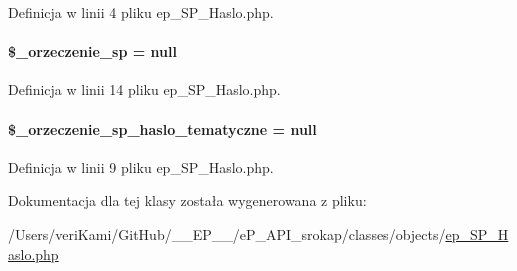 Definicja w linii 4 pliku ep\-\_\-\-S\-P\-\_\-\-Haslo.\-php.

\hypertarget{classep___s_p___haslo_aa2e1ecb50e6fae26a854ac995f7226b8}{
\paragraph[{\$\-\_\-orzeczenie\-\_\-sp}]{\setlength{\rightskip}{0pt plus 5cm}\$\-\_\-orzeczenie\-\_\-sp = null\hspace{0.3cm}{\ttfamily [protected]}}}\label{classep___s_p___haslo_aa2e1ecb50e6fae26a854ac995f7226b8}


Definicja w linii 14 pliku ep\-\_\-\-S\-P\-\_\-\-Haslo.\-php.

\hypertarget{classep___s_p___haslo_ad00ee90f32b429d419d6e1024bcda64b}{
\paragraph[{\$\-\_\-orzeczenie\-\_\-sp\-\_\-haslo\-\_\-tematyczne}]{\setlength{\rightskip}{0pt plus 5cm}\$\-\_\-orzeczenie\-\_\-sp\-\_\-haslo\-\_\-tematyczne = null\hspace{0.3cm}{\ttfamily [protected]}}}\label{classep___s_p___haslo_ad00ee90f32b429d419d6e1024bcda64b}


Definicja w linii 9 pliku ep\-\_\-\-S\-P\-\_\-\-Haslo.\-php.



Dokumentacja dla tej klasy została wygenerowana z pliku\-:\begin{DoxyCompactItemize}
\item 
/\-Users/veri\-Kami/\-Git\-Hub/\-\_\-\-\_\-\-E\-P\-\_\-\-\_\-/e\-P\-\_\-\-A\-P\-I\-\_\-srokap/classes/objects/\hyperlink{ep___s_p___haslo_8php}{ep\-\_\-\-S\-P\-\_\-\-Haslo.\-php}\end{DoxyCompactItemize}

